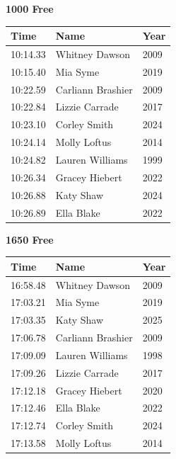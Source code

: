 \vspace{1.2em}
\noindent\begin{minipage}[t]{0.48\textwidth}
\centering
\textbf{\textcolor{teamprimary}{1000 Free}}\par
\vspace{0.5em}
\centering
\small
\renewcommand{\arraystretch}{1.0}
\setlength{\tabcolsep}{4pt}
\begin{tabular}{@{}p{1.8cm}p{3.0cm}p{1.0cm}@{}}
\toprule
\textbf{Time} & \textbf{Name} & \textbf{Year} \\
\midrule
10:14.33 & Whitney Dawson & 2009 \\
10:15.40 & Mia Syme & 2019 \\
10:22.59 & Carliann Brashier & 2009 \\
10:22.84 & Lizzie Carrade & 2017 \\
10:23.10 & Corley Smith & 2024 \\
10:24.14 & Molly Loftus & 2014 \\
10:24.82 & Lauren Williams & 1999 \\
10:26.34 & Gracey Hiebert & 2022 \\
10:26.88 & Katy Shaw & 2024 \\
10:26.89 & Ella Blake & 2022 \\
\bottomrule
\end{tabular}
\end{minipage}
\hfill
\begin{minipage}[t]{0.48\textwidth}
\centering
\textbf{\textcolor{teamprimary}{1650 Free}}\par
\vspace{0.5em}
\centering
\small
\renewcommand{\arraystretch}{1.0}
\setlength{\tabcolsep}{4pt}
\begin{tabular}{@{}p{1.8cm}p{3.0cm}p{1.0cm}@{}}
\toprule
\textbf{Time} & \textbf{Name} & \textbf{Year} \\
\midrule
16:58.48 & Whitney Dawson & 2009 \\
17:03.21 & Mia Syme & 2019 \\
17:03.35 & Katy Shaw & 2025 \\
17:06.78 & Carliann Brashier & 2009 \\
17:09.09 & Lauren Williams & 1998 \\
17:09.26 & Lizzie Carrade & 2017 \\
17:12.18 & Gracey Hiebert & 2020 \\
17:12.46 & Ella Blake & 2022 \\
17:12.74 & Corley Smith & 2024 \\
17:13.58 & Molly Loftus & 2014 \\
\bottomrule
\end{tabular}
\end{minipage}
